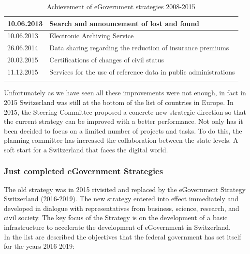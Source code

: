 \begin{longtable}[c]{| m{2.5cm} | m{11cm}|}
 10.06.2013 & Search and announcement of lost and found\\ \hline
 10.06.2013 & Electronic Archiving Service\\ \hline
 26.06.2014 & Data sharing regarding the reduction of insurance premiums\\ \hline
 20.02.2015 & Certifications of changes of civil status\\ \hline
 11.12.2015 & Services for the use of reference data in public administrations\\ \hline
\caption{Achievement of eGovernment strategies 2008-2015 \cite{resoconto2015}}
\label{tab:Achievement of eGovernment strategies 2008-2015}\\
\end{longtable}
Unfortunately as we have seen all these improvements were not enough, in fact in 2015 Switzerland was still at the bottom of the list of countries in Europe.
In 2015, the Steering Committee proposed a concrete new strategic direction so that the current strategy can be improved with a better performance.
Not only has it been decided to focus on a limited number of projects and tasks. To do this, the planning committee has increased the collaboration between the state levels.
A soft start for a Switzerland that faces the digital world.

\subsubsection{Just completed eGovernment Strategies}
The old strategy was in 2015 rivisited and replaced by the eGovernment Strategy Switzerland (2016-2019). The new strategy entered into effect immediately and developed in dialogue with representatives from business, science, research, and civil society. The key focus of the Strategy is on the development of a basic infrastructure to accelerate the development of eGovernment in Switzerland.\\

In the list are described the objectives that the federal government has set itself for the years 2016-2019:

